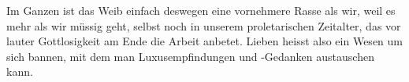 Im Ganzen ist das Weib einfach deswegen eine vornehmere Rasse als wir, weil es mehr als wir müssig geht, selbst noch in unserem proletarischen Zeitalter, das vor lauter Gottlosigkeit am Ende die Arbeit anbetet. Lieben heisst also ein Wesen um sich bannen, mit dem man Luxusempfindungen und -Gedanken austauschen kann.
\par

